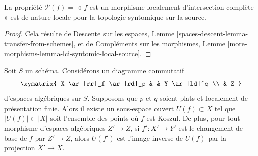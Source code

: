 \begin{lemma}
\label{lemma-lci-syntomic-local-source}
La propriété $\mathcal{P}(f) =$ « $f$ est un morphisme localement
d'intersection complète » est de nature locale pour la topologie syntomique sur la source.
\end{lemma}

\begin{proof}
Cela résulte de
Descente sur les espaces, Lemme \ref{spaces-descent-lemma-transfer-from-schemes}, et de
Compléments sur les morphismes, Lemme \ref{more-morphisms-lemma-lci-syntomic-local-source}.
\end{proof}

\begin{lemma}
\label{lemma-base-change-lci-fibres}
Soit $S$ un schéma. Considérons un diagramme commutatif
$$
\xymatrix{
X \ar[rr]_f \ar[rd]_p & & Y \ar[ld]^q \\
& Z
}
$$
d'espaces algébriques sur $S$. Supposons que $p$ et $q$
soient plats et localement de présentation finie.
Alors il existe un sous-espace ouvert $U(f) \subset X$
tel que $|U(f)| \subset |X|$ soit l'ensemble des points où $f$ est Koszul.
De plus, pour tout morphisme d'espaces algébriques $Z' \to Z$, si
$f' : X' \to Y'$ est le changement de base de $f$ par $Z' \to Z$, alors
$U(f')$ est l'image inverse de $U(f)$ par la projection $X' \to X$.
\end{lemma}

